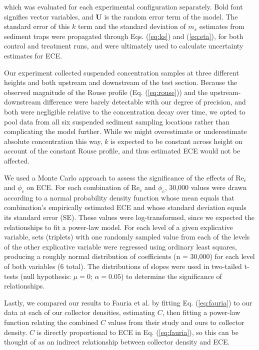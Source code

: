 \documentclass[geosciences,article,submit,moreauthors,pdftex]{Definitions/mdpi}
\newcommand\Rey{\mathrm{Re}}
\begin{document}
\noindent which was evaluated for each experimental configuration separately. Bold font signifies vector variables, and $\boldsymbol{U}$ is the random error term of the model. The standard error of this $k$ term and the standard deviation of $m_s$ estimates from sediment traps were propagated through Eqs. (\ref{eq:ks}) and (\ref{eq:eta}), for both control and treatment runs, and were ultimately used to calculate uncertainty estimates for ECE.

Our experiment collected suspended concentration samples at three different heights and both upstream and downstream of the test section. Because the observed magnitude of the Rouse profile (Eq. (\ref{eq:rouse})) and the upstream-downstream difference were barely detectable with our degree of precision, and both were negligible relative to the concentration decay over time, we opted to pool data from all six suspended sediment sampling locations rather than complicating the model further. While we might overestimate or underestimate absolute concentration this way, $k$ is expected to be constant across height on account of the constant Rouse profile, and thus estimated ECE would not be affected.

We used a Monte Carlo approach to assess the significance of the effects of $\Rey_c$ and $\phi_c$ on ECE. For each combination of $\Rey_c$ and $\phi_c$, 30,000 values were drawn according to a normal probability density function whose mean equals that combination's empirically estimated ECE and whose standard deviation equals its standard error (SE). These values were log-transformed, since we expected the relationships to fit a power-law model. For each level of a given explicative variable, sets (triplets) with one randomly sampled value from each of the levels of the other explicative variable were regressed using ordinary least squares, producing a roughly normal distribution of coefficients (n = 30,000) for each level of both variables (6 total). The distributions of slopes were used in two-tailed t-tests (null hypothesis: $\mu = 0$; $\alpha = 0.05$) to determine the significance of relationships.

Lastly, we compared our results to Fauria et al. \cite{Fauria_2015} by fitting Eq. (\ref{eq:fauria}) to our data at each of our collector densities, estimating $C$, then fitting a power-law function relating the combined $C$ values from their study and ours to collector density. $C$ is directly proportional to ECE in Eq. (\ref{eq:fauria}), so this can be thought of as an indirect relationship between collector density and ECE.
\end{document}
